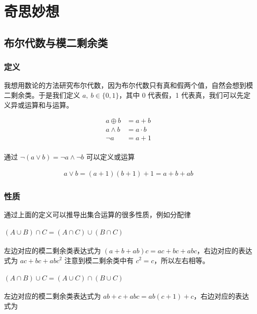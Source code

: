 \chapter{奇思妙想}

\section{布尔代数与模二剩余类}

\subsection{定义}

我想用数论的方法研究布尔代数，因为布尔代数只有真和假两个值，自然会想到模二剩余类。于是我们定义 $a, \: b \in \{ 0, 1\}$，其中 0 代表假，1 代表真，我们可以先定义异或运算和与运算。

\begin{align*}
    a \oplus b & = a + b \\
    a \land b &= a \cdot b \\
    \neg a &= a + 1 \\
\end{align*}

通过 $\neg(a \lor b) = \neg a \land \neg b $ 可以定义或运算

\begin{align*}
    a \lor b = (a+1)(b+1) + 1 = a + b + ab
\end{align*}


\subsection{性质}

通过上面的定义可以推导出集合运算的很多性质，例如分配律

\subsubsection{$(A \cup B) \cap C = (A \cap C) \cup (B \cap C)$}

左边对应的模二剩余类表达式为 $(a+b+ab)c = ac +bc + abc$，右边对应的表达式为 $ac + bc + abc^2$ 注意到模二剩余类中有 $c^2 = c$，所以左右相等。


\subsubsection{$(A \cap B) \cup C = (A \cup C) \cap (B \cup C)$}

左边对应的模二剩余类表达式为 $ab + c + abc = ab(c+1) +c$，右边对应的表达式为 

